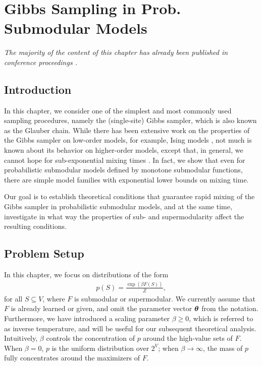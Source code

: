 \chapter{Gibbs Sampling in Prob. Submodular Models} \label{ch:gibbs}

\emph{The majority of the content of this chapter has already been published in conference proceedings \citep{gotovos15}.}

\section{Introduction}
In this chapter, we consider one of the simplest and most commonly used sampling procedures, namely the (single-site) Gibbs sampler, which is also known as the Glauber chain.
While there has been extensive work on the properties of the Gibbs sampler on low-order models, for example, Ising models \citep[Ch. 15]{levin08book}, not much is known about its behavior on higher-order models, except that, in general, we cannot hope for sub-exponential mixing times \citep{jerrum93}.
In fact, we show that even for probabilistic submodular models defined by monotone submodular functions, there are simple model families with exponential lower bounds on mixing time.

Our goal is to establish theoretical conditions that guarantee rapid mixing of the Gibbs sampler in probabilistic submodular models, and at the same time, investigate in what way the properties of sub- and supermodularity affect the resulting conditions.


\section{Problem Setup} \label{sect:setup}
In this chapter, we focus on distributions of the form
\begin{align}\label{eq:gibbs_pdef}
p(S) = \frac{\exp(\beta F(S))}{Z},
\end{align}
for all $S \subseteq V$, where $F$ is submodular or supermodular.
We currently assume that $F$ is already learned or given, and omit the parameter vector $\bm{\theta}$ from the notation.
Furthermore, we have introduced a scaling parameter $\beta \geq 0$, which is referred to as inverse temperature, and will be useful for our subsequent theoretical analysis.
Intuitively, $\beta$ controls the concentration of $p$ around the high-value sets of $F$.
When $\beta = 0$, $p$ is the uniform distribution over $2^V$; when $\beta \to \infty$, the mass of $p$ fully concentrates around the maximizers of $F$.

